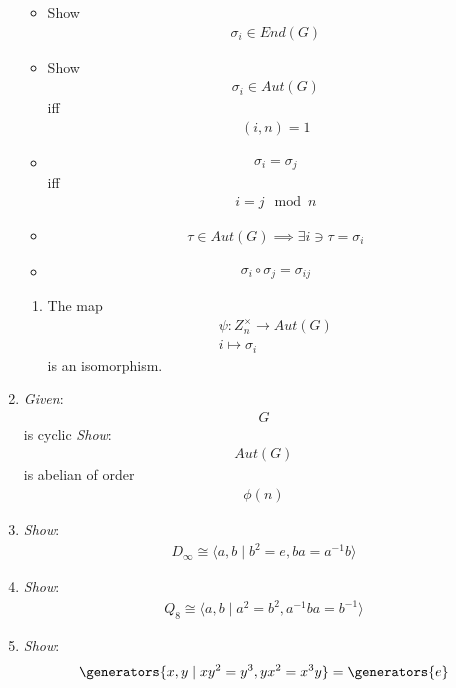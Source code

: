 \begin{enumerate}
  \begin{itemize}
  \tightlist
  \item
    Show \begin{align*}
    \sigma_i \in End(G)\end{align*}
  \item
    Show \begin{align*}
    \sigma_i \in Aut(G)\end{align*}
     iff \begin{align*}
    (i, n) = 1\end{align*}
  \item
    \begin{align*}
    \sigma_i = \sigma_j\end{align*}
     iff \begin{align*}
    i=j\mod n\end{align*}
  \item
    \begin{align*}
    \tau \in Aut(G) \implies \exists i \ni \tau = \sigma_i\end{align*}
  \item
    \begin{align*}
    \sigma_i \circ \sigma_j = \sigma_{ij}\end{align*}
  \end{itemize}

  \begin{enumerate}
  \def\labelenumii{\arabic{enumii}.}
  \setcounter{enumii}{5}
  \tightlist
  \item
    The map \begin{align*}
    \psi: Z_n^\times \rightarrow Aut(G)\\ i \mapsto \sigma_i\end{align*}
     is an isomorphism.
  \end{enumerate}
\item
  \emph{Given}: \begin{align*}
  G\end{align*}
   is cyclic \emph{Show}: \begin{align*}
  Aut(G)\end{align*}
   is abelian of order \begin{align*}
  \phi(n)\end{align*}
\item
  \emph{Show}: \begin{align*}
  D_\infty \cong \langle a,b \mid b^2 = e, ba = a^{-1} b \rangle\end{align*}
\item
  \emph{Show}: \begin{align*}
  Q_8 \cong \langle a,b \mid a^2 = b^2, a^{-1}ba = b^{-1}\rangle\end{align*}
\item
  \emph{Show}: \begin{align*}
  \generators{x,y \mid xy^2 = y^3, yx^2 = x^3y} = \generators{e}\end{align*}
\end{enumerate}


